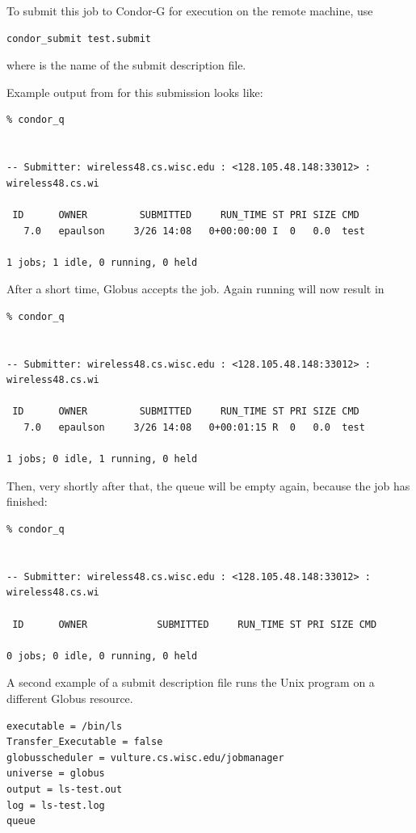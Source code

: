 To submit this job to Condor-G for execution on the
remote machine, use
\begin{verbatim}
condor_submit test.submit
\end{verbatim}
where  is the name of the submit description file.

Example output from 
 for this submission looks like:
\footnotesize
\begin{verbatim}
% condor_q


-- Submitter: wireless48.cs.wisc.edu : <128.105.48.148:33012> : wireless48.cs.wi

 ID      OWNER         SUBMITTED     RUN_TIME ST PRI SIZE CMD
   7.0   epaulson     3/26 14:08   0+00:00:00 I  0   0.0  test

1 jobs; 1 idle, 0 running, 0 held
\end{verbatim}
\normalsize

After a short time, Globus accepts the job.
Again running  will now result in

\footnotesize
\begin{verbatim}
% condor_q


-- Submitter: wireless48.cs.wisc.edu : <128.105.48.148:33012> : wireless48.cs.wi

 ID      OWNER         SUBMITTED     RUN_TIME ST PRI SIZE CMD
   7.0   epaulson     3/26 14:08   0+00:01:15 R  0   0.0  test

1 jobs; 0 idle, 1 running, 0 held
\end{verbatim}
\normalsize

Then, very shortly after that, the queue will be empty again,
because the job has finished:

\footnotesize
\begin{verbatim}
% condor_q


-- Submitter: wireless48.cs.wisc.edu : <128.105.48.148:33012> : wireless48.cs.wi

 ID      OWNER            SUBMITTED     RUN_TIME ST PRI SIZE CMD

0 jobs; 0 idle, 0 running, 0 held
\end{verbatim}
\normalsize


A second example of a submit description file runs the Unix 
program on a different Globus resource.

\footnotesize
\begin{verbatim}
executable = /bin/ls
Transfer_Executable = false
globusscheduler = vulture.cs.wisc.edu/jobmanager
universe = globus
output = ls-test.out
log = ls-test.log
queue
\end{verbatim} 
\normalsize

